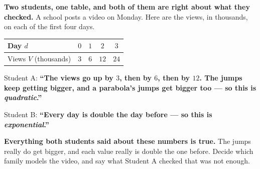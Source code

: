 \documentclass[10pt]{article}
\begin{document}
\boxguard[12]
\begin{hookbox}
\small
\textbf{Two students, one table, and both of them are right about what they checked.} A school posts
a video on Monday. Here are the views, in thousands, on each of the first four days.

\smallskip
\begin{center}
\renewcommand{\arraystretch}{1.25}
\begin{tabular}{@{}|l|c|c|c|c|@{}}
\hline
Day $d$ & $0$ & $1$ & $2$ & $3$ \\ \hline
Views $V$ (thousands) & $3$ & $6$ & $12$ & $24$ \\
\hline
\end{tabular}
\end{center}

\smallskip
Student A: \textbf{``The views go up by $3$, then by $6$, then by $12$. The jumps keep getting
bigger, and a parabola's jumps get bigger too --- so this is \emph{quadratic}.''}

\smallskip
Student B: \textbf{``Every day is double the day before --- so this is \emph{exponential}.''}

\smallskip
\textbf{Everything both students said about these numbers is true.} The jumps really do get bigger,
and each value really is double the one before. Decide which family models the video, and say what
Student A checked that was not enough.

\end{hookbox}

\vspace{0.10in}
\end{document}
